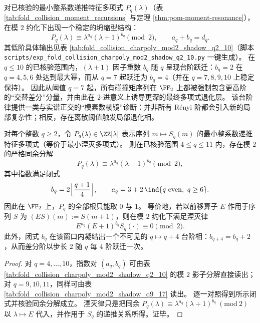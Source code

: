 

\begin{remark}\label{rem:pom-charpoly-mod2-staircase-q2-10}
对已核验的最小整系数递推特征多项式 \(P_q(\lambda)\)（表 \ref{tab:fold_collision_moment_recursions} 与定理 \ref{thm:pom-moment-resonance}），在模 \(2\) 约化下出现一个稳定的坍缩型结构：
\[
P_q(\lambda)\equiv \lambda^{a_q}(\lambda+1)^{b_q}\pmod 2,
\qquad a_q+b_q=d_q.
\]
其低阶具体输出见表 \ref{tab:fold_collision_charpoly_mod2_shadow_q2_10}（脚本 \texttt{scripts/exp\_fold\_collision\_charpoly\_mod2\_shadow\_q2\_10.py} 一键生成）。
在 \(q\le 10\) 的已核验范围内，\((\lambda+1)\) 因子重数 \(b_q\) 随 \(q\) 呈现台阶跃迁：\(b_q=2\) 在 \(q=4,5,6\) 处达到最大幂，而从 \(q=7\) 起跃迁为 \(b_q=4\)（并在 \(q=7,8,9,10\) 上稳定保持）。
因此从阈值 \(q=7\) 起，所有碰撞矩序列在 \(\FF_2\) 上都被强制包含更高阶的“交替差分”分量，并由此在 \(2\)-进意义上诱导更深的最终多项式退化层。
该台阶律提供一类与实谱正交的“模素数棱镜”诊断：并非所有 Rényi 阶都会引入新的局部复杂性；相反，存在离散阈值触发局部退化相。
\end{remark}



\begin{proposition}\label{prop:pom-charpoly-mod2-closed-exponent-law-q4-11}
对每个整数 \(q\ge 2\)，令 \(P_q(\lambda)\in\ZZ[\lambda]\) 表示序列 \(m\mapsto S_q(m)\) 的最小整系数递推特征多项式（等价于最小湮灭多项式）。
则在已核验范围 \(4\le q\le 11\) 内，存在模 \(2\) 的严格同余分解
\[
P_q(\lambda)\equiv \lambda^{a_q}(\lambda+1)^{b_q}\pmod 2,
\]
其中指数满足闭式
\[
b_q=2\Bigl\lfloor\frac{q+1}{4}\Bigr\rfloor,\qquad
a_q=3+2\,\ind\{q\ \mathrm{even},\ q\ge 6\}.
\]
因此在 \(\FF_2\) 上，\(P_q\) 的全部根只能取 \(0\) 与 \(1\)。
等价地，若以前移算子 \(E\) 作用于序列 \(S\) 为 \((ES)(m):=S(m+1)\)，则在模 \(2\) 约化下满足湮灭律
\[
E^{a_q}(E+1)^{b_q}S_q(\cdot)\equiv 0\pmod 2.
\]
此外，闭式 \(b_q\) 在该窗口内凝结出一个不可见的 \(q\mapsto q+4\) 台阶相：\(b_{q+4}=b_q+2\)，从而差分阶以步长 \(2\) 随 \(q\) 每 \(4\) 阶跃迁一次。
\end{proposition}
\begin{proof}
对 \(q=4,\dots,10\)，指数对 \((a_q,b_q)\) 可由表 \ref{tab:fold_collision_charpoly_mod2_shadow_q2_10} 的模 \(2\) 影子分解直接读出；对 \(q=9,10,11\)，同样可由表 \ref{tab:fold_collision_charpoly_mod2_shadow_q9_17} 读出。
逐一对照得到所示闭式并核验同余分解成立。
湮灭律只是把同余 \(P_q(\lambda)\equiv \lambda^{a_q}(\lambda+1)^{b_q}\ (\mathrm{mod}\ 2)\) 以 \(\lambda\mapsto E\) 代入，并作用于 \(S_q\) 的递推关系所得。证毕。
\end{proof}

